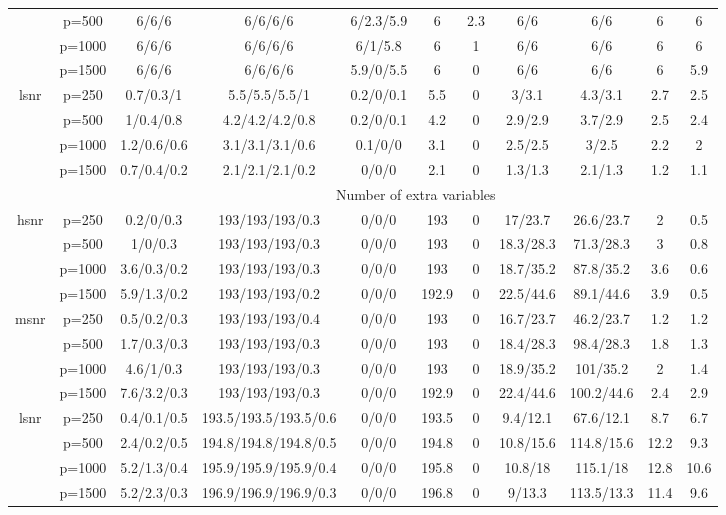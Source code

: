 \begin{table}[ht]
{\begin{tabular}{|c|c|ccccccccc|}
   & p=500 & 6/6/6 & 6/6/6/6 & 6/2.3/5.9 & 6 & 2.3 & 6/6 & 6/6 & 6 & 6 \\ 
   & p=1000 & 6/6/6 & 6/6/6/6 & 6/1/5.8 & 6 & 1 & 6/6 & 6/6 & 6 & 6 \\ 
   & p=1500 & 6/6/6 & 6/6/6/6 & 5.9/0/5.5 & 6 & 0 & 6/6 & 6/6 & 6 & 5.9 \\ 
  \midrule\multirow{4}[2]{*}{lsnr} & p=250 & 0.7/0.3/1 & 5.5/5.5/5.5/1 & 0.2/0/0.1 & 5.5 & 0 & 3/3.1 & 4.3/3.1 & 2.7 & 2.5 \\ 
   & p=500 & 1/0.4/0.8 & 4.2/4.2/4.2/0.8 & 0.2/0/0.1 & 4.2 & 0 & 2.9/2.9 & 3.7/2.9 & 2.5 & 2.4 \\ 
   & p=1000 & 1.2/0.6/0.6 & 3.1/3.1/3.1/0.6 & 0.1/0/0 & 3.1 & 0 & 2.5/2.5 & 3/2.5 & 2.2 & 2 \\ 
   & p=1500 & 0.7/0.4/0.2 & 2.1/2.1/2.1/0.2 & 0/0/0 & 2.1 & 0 & 1.3/1.3 & 2.1/1.3 & 1.2 & 1.1 \\ 
   \midrule 
 \multicolumn{1}{|c}{} &       & \multicolumn{9}{c|}{Number of extra variables} \\
\midrule\multirow{4}[2]{*}{hsnr} & p=250 & 0.2/0/0.3 & 193/193/193/0.3 & 0/0/0 & 193 & 0 & 17/23.7 & 26.6/23.7 & 2 & 0.5 \\ 
   & p=500 & 1/0/0.3 & 193/193/193/0.3 & 0/0/0 & 193 & 0 & 18.3/28.3 & 71.3/28.3 & 3 & 0.8 \\ 
   & p=1000 & 3.6/0.3/0.2 & 193/193/193/0.3 & 0/0/0 & 193 & 0 & 18.7/35.2 & 87.8/35.2 & 3.6 & 0.6 \\ 
   & p=1500 & 5.9/1.3/0.2 & 193/193/193/0.2 & 0/0/0 & 192.9 & 0 & 22.5/44.6 & 89.1/44.6 & 3.9 & 0.5 \\ 
  \midrule\multirow{4}[2]{*}{msnr} & p=250 & 0.5/0.2/0.3 & 193/193/193/0.4 & 0/0/0 & 193 & 0 & 16.7/23.7 & 46.2/23.7 & 1.2 & 1.2 \\ 
   & p=500 & 1.7/0.3/0.3 & 193/193/193/0.3 & 0/0/0 & 193 & 0 & 18.4/28.3 & 98.4/28.3 & 1.8 & 1.3 \\ 
   & p=1000 & 4.6/1/0.3 & 193/193/193/0.3 & 0/0/0 & 193 & 0 & 18.9/35.2 & 101/35.2 & 2 & 1.4 \\ 
   & p=1500 & 7.6/3.2/0.3 & 193/193/193/0.3 & 0/0/0 & 192.9 & 0 & 22.4/44.6 & 100.2/44.6 & 2.4 & 2.9 \\ 
  \midrule\multirow{4}[2]{*}{lsnr} & p=250 & 0.4/0.1/0.5 & 193.5/193.5/193.5/0.6 & 0/0/0 & 193.5 & 0 & 9.4/12.1 & 67.6/12.1 & 8.7 & 6.7 \\ 
   & p=500 & 2.4/0.2/0.5 & 194.8/194.8/194.8/0.5 & 0/0/0 & 194.8 & 0 & 10.8/15.6 & 114.8/15.6 & 12.2 & 9.3 \\ 
   & p=1000 & 5.2/1.3/0.4 & 195.9/195.9/195.9/0.4 & 0/0/0 & 195.8 & 0 & 10.8/18 & 115.1/18 & 12.8 & 10.6 \\ 
   & p=1500 & 5.2/2.3/0.3 & 196.9/196.9/196.9/0.3 & 0/0/0 & 196.8 & 0 & 9/13.3 & 113.5/13.3 & 11.4 & 9.6 \\ 
   \bottomrule 
\end{tabular}
}
\end{table}
